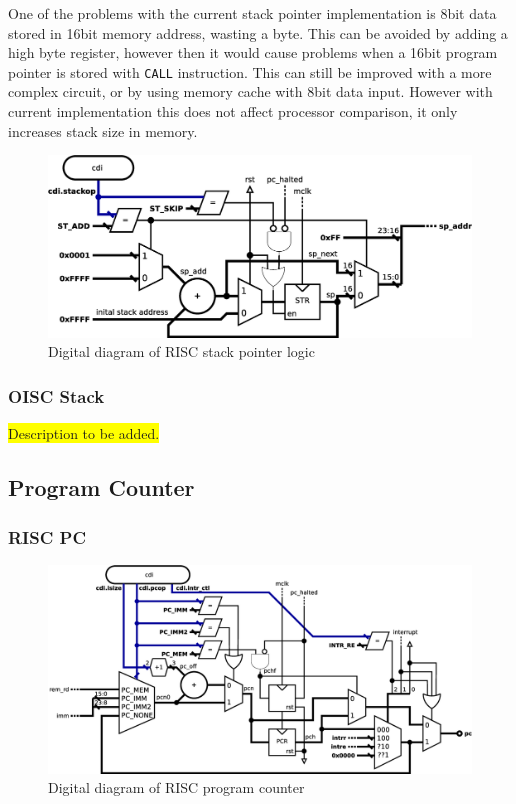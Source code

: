 One of the problems with the current stack pointer implementation is 8bit data stored in 16bit memory address, wasting a byte. This can be avoided by adding a high byte register, however then it would cause problems when a 16bit program pointer is stored with \texttt{CALL} instruction. This can still be improved with a more complex circuit, or by using memory cache with 8bit data input. However with current implementation this does not affect processor comparison, it only increases stack size in memory.

\begin{figure}[h!]
	\centering
	\includegraphics[width=\linewidth]{../resources/risc_stack.eps}
	\caption{Digital diagram of RISC stack pointer logic}
	\label{fig:risc_stack}
\end{figure}

\subsubsection{OISC Stack}

\colorbox{yellow}{Description to be added.}

\subsection{Program Counter} \label{subsec:pc}

\subsubsection{RISC PC}

\begin{figure}[h!]
	\centering
	\includegraphics[width=\linewidth]{../resources/risc_pc.eps}
	\caption{Digital diagram of RISC program counter}
	\label{fig:risc_pc}
\end{figure}

